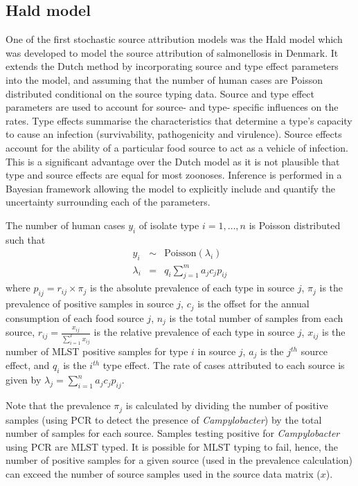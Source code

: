 \subsection{Hald model}\label{sec:hald}
One of the first stochastic source attribution models was the Hald model \citep{HaldVosWed04} which was developed to model the source attribution of salmonellosis in Denmark. It extends the Dutch 
method by incorporating source and type effect parameters into the model, and assuming that the number of human cases are Poisson distributed conditional on the source typing data.  Source and 
type effect parameters are used to account for source- and type- specific influences on the rates. Type effects summarise the characteristics that determine a type's capacity to cause an infection 
(survivability, pathogenicity and virulence). Source effects account for the ability of a particular food source to act as a vehicle of infection. This is a significant advantage over the Dutch model as it is 
not plausible that type and source effects are equal for most zoonoses.  Inference is performed in a Bayesian framework allowing the model to explicitly include and quantify the uncertainty 
surrounding each of the parameters.

The number of human cases $y_i$ of isolate type $i=1,\dots,n$ is Poisson distributed such that 
\begin{eqnarray}
y_i & \sim & \mbox{Poisson} (\lambda_i) \\
\lambda_i & = & q_i\sum_{j=1}^{m} a_j c_j p_{ij}\label{eq:haldmodel}
\end{eqnarray}
where $p_{ij}=r_{ij}\times \pi_j$ is the absolute prevalence of each type in source $j$, $\pi_j$ is the prevalence of positive samples in source $j$, $c_j$ is the offset for 
the annual consumption of each food source $j$, $n_j$ is the total number of samples from each source, $r_{ij}=\frac{x_{ij}}{\sum_{i=1}^{I}x_{ij}}$ is the relative prevalence of each type in source $j$, 
$x_{ij}$ is the number of MLST positive samples for type $i$ in source $j$, $a_j$ is the $j^{th}$ source effect, and $q_i$ is the $i^{th}$ type effect. The rate of cases attributed to each source is given by $
\lambda_j=\sum_{i=1}^{n} a_j c_j p_{ij}$. 

Note that the prevalence $\pi_j$ is calculated by dividing the number of positive samples (using PCR to detect the presence of \emph{Campylobacter}) by the total number of samples for each source. Samples testing positive for \emph{Campylobacter} using PCR are MLST typed. It is possible for MLST typing to fail, hence, the number of positive samples for a given source (used in the prevalence calculation) can exceed the number of source samples used in the source data matrix ($x$).

